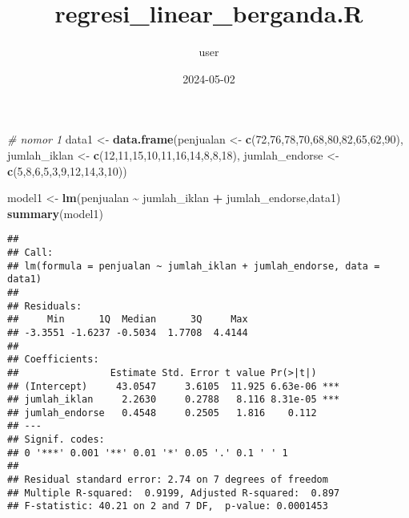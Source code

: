 \documentclass[
]{article}
\title{regresi\_linear\_berganda.R}
\author{user}
\date{2024-05-02}
\newenvironment{Shaded}{\begin{snugshade}}{\end{snugshade}}
\newcommand{\CommentTok}[1]{\textcolor[rgb]{0.56,0.35,0.01}{\textit{#1}}}
\newcommand{\DecValTok}[1]{\textcolor[rgb]{0.00,0.00,0.81}{#1}}
\newcommand{\FunctionTok}[1]{\textcolor[rgb]{0.13,0.29,0.53}{\textbf{#1}}}
\newcommand{\NormalTok}[1]{#1}
\newcommand{\OtherTok}[1]{\textcolor[rgb]{0.56,0.35,0.01}{#1}}
\newcommand{\SpecialCharTok}[1]{\textcolor[rgb]{0.81,0.36,0.00}{\textbf{#1}}}
\begin{document}
\maketitle

\begin{Shaded}
\begin{Highlighting}[]
\CommentTok{\# nomor 1}
\NormalTok{data1 }\OtherTok{\textless{}{-}} \FunctionTok{data.frame}\NormalTok{(penjualan }\OtherTok{\textless{}{-}} \FunctionTok{c}\NormalTok{(}\DecValTok{72}\NormalTok{,}\DecValTok{76}\NormalTok{,}\DecValTok{78}\NormalTok{,}\DecValTok{70}\NormalTok{,}\DecValTok{68}\NormalTok{,}\DecValTok{80}\NormalTok{,}\DecValTok{82}\NormalTok{,}\DecValTok{65}\NormalTok{,}\DecValTok{62}\NormalTok{,}\DecValTok{90}\NormalTok{),}
\NormalTok{                    jumlah\_iklan }\OtherTok{\textless{}{-}} \FunctionTok{c}\NormalTok{(}\DecValTok{12}\NormalTok{,}\DecValTok{11}\NormalTok{,}\DecValTok{15}\NormalTok{,}\DecValTok{10}\NormalTok{,}\DecValTok{11}\NormalTok{,}\DecValTok{16}\NormalTok{,}\DecValTok{14}\NormalTok{,}\DecValTok{8}\NormalTok{,}\DecValTok{8}\NormalTok{,}\DecValTok{18}\NormalTok{),}
\NormalTok{                    jumlah\_endorse }\OtherTok{\textless{}{-}} \FunctionTok{c}\NormalTok{(}\DecValTok{5}\NormalTok{,}\DecValTok{8}\NormalTok{,}\DecValTok{6}\NormalTok{,}\DecValTok{5}\NormalTok{,}\DecValTok{3}\NormalTok{,}\DecValTok{9}\NormalTok{,}\DecValTok{12}\NormalTok{,}\DecValTok{14}\NormalTok{,}\DecValTok{3}\NormalTok{,}\DecValTok{10}\NormalTok{))}

\NormalTok{model1 }\OtherTok{\textless{}{-}} \FunctionTok{lm}\NormalTok{(penjualan }\SpecialCharTok{\textasciitilde{}}\NormalTok{ jumlah\_iklan }\SpecialCharTok{+}\NormalTok{ jumlah\_endorse,data1)}
\FunctionTok{summary}\NormalTok{(model1)}
\end{Highlighting}
\end{Shaded}

\begin{verbatim}
## 
## Call:
## lm(formula = penjualan ~ jumlah_iklan + jumlah_endorse, data = data1)
## 
## Residuals:
##     Min      1Q  Median      3Q     Max 
## -3.3551 -1.6237 -0.5034  1.7708  4.4144 
## 
## Coefficients:
##                Estimate Std. Error t value Pr(>|t|)    
## (Intercept)     43.0547     3.6105  11.925 6.63e-06 ***
## jumlah_iklan     2.2630     0.2788   8.116 8.31e-05 ***
## jumlah_endorse   0.4548     0.2505   1.816    0.112    
## ---
## Signif. codes:  
## 0 '***' 0.001 '**' 0.01 '*' 0.05 '.' 0.1 ' ' 1
## 
## Residual standard error: 2.74 on 7 degrees of freedom
## Multiple R-squared:  0.9199, Adjusted R-squared:  0.897 
## F-statistic: 40.21 on 2 and 7 DF,  p-value: 0.0001453
\end{verbatim}
\end{document}
